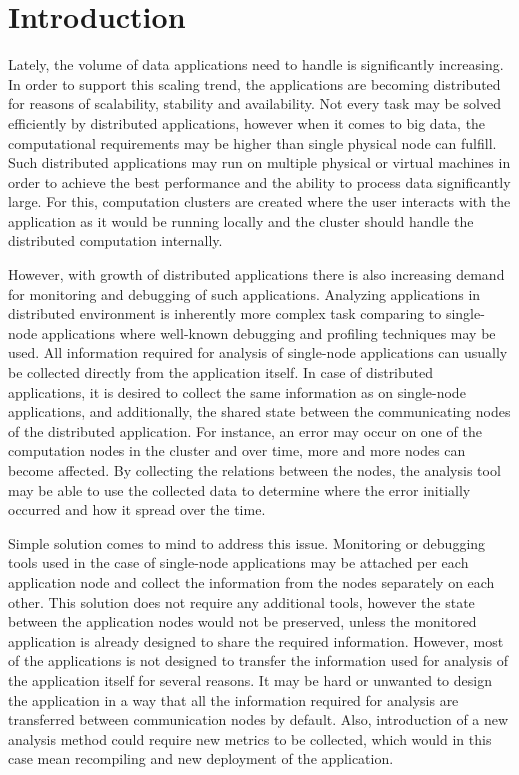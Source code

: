 \chapter{Introduction}
Lately, the volume of data applications need to handle is significantly increasing. In order to support this scaling trend, the applications are becoming distributed for reasons of scalability, stability and availability. Not every task may be solved efficiently by distributed applications, however when it comes to big data, the computational requirements may be higher than single physical node can fulfill. Such distributed applications may run on multiple physical or virtual machines in order to achieve the best performance and the ability to process data significantly large. For this, computation clusters are created where the user interacts with the application as it would be running locally and the cluster should handle the distributed computation internally.

However, with growth of distributed applications there is also increasing demand for monitoring and debugging of such applications. Analyzing applications in distributed environment is inherently more complex task comparing to single-node applications where well-known debugging and profiling techniques may be used. All information required for analysis of single-node applications can usually be collected directly from the application itself. In case of distributed applications, it is desired to collect the same information as on single-node applications, and additionally, the shared state between the communicating nodes of the distributed application. For instance, an error may occur on one of the computation nodes in the cluster and over time, more and more nodes can become affected. By collecting the relations between the nodes, the analysis tool may be able to use the collected data to determine where the error initially occurred and how it spread over the time. 

Simple solution comes to mind to address this issue. Monitoring or debugging tools used in the case of single-node applications may be attached per each application node and collect the information from the nodes separately on each other. This solution does not require any additional tools, however the state between the application nodes would not be preserved, unless the monitored application is already designed to share the required information. However, most of the applications is not designed to transfer the information used for analysis of the application itself for several reasons. It may be hard or unwanted to design the application in a way that all the information required for analysis are transferred between communication nodes by default. Also, introduction of a new analysis method could require new metrics to be collected, which would in this case mean recompiling and new deployment of the application.

